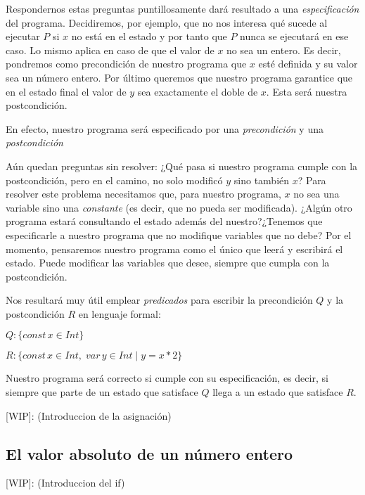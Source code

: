 \documentclass[11pt, a4paper, openany]{book}
\begin{document}
    Respondernos estas preguntas puntillosamente dará resultado a una \textit{especificación} del programa.
    Decidiremos, por ejemplo, que no nos interesa qué sucede al ejecutar $P$ si $x$ no está en el estado y por tanto que $P$ nunca se ejecutará en ese caso. Lo mismo aplica en caso de que el valor de $x$ no sea un entero. Es decir, pondremos como precondición de nuestro programa que $x$ esté definida y su valor sea un número entero. Por último queremos que nuestro programa garantice que en el estado final el valor de $y$ sea exactamente el doble de $x$. Esta será nuestra postcondición.

    En efecto, nuestro programa será especificado por una \textit{precondición} y una \textit{postcondición}

    Aún quedan preguntas sin resolver:
    ¿Qué pasa si nuestro programa cumple con la postcondición, pero en el camino, no solo modificó $y$ sino también $x$? Para resolver este problema necesitamos que, para nuestro programa, $x$ no sea una variable sino una \textit{constante} (es decir, que no pueda ser modificada).
    ¿Algún otro programa estará consultando el estado además del nuestro?¿Tenemos que especificarle a nuestro programa que no modifique variables que no debe? Por el momento, pensaremos nuestro programa como el único que leerá y escribirá el estado. Puede modificar las variables que desee, siempre que cumpla con la postcondición.

    Nos resultará muy útil emplear \textit{predicados} para escribir la precondición $Q$ y la postcondición $R$ en lenguaje formal:

    \begin{math}
        Q: \lbrace const\,x \in Int \rbrace
    \end{math}


    \begin{math}
        R: \lbrace const\,x \in Int,\; var\,y \in Int\;|\;y = x * 2 \rbrace
    \end{math}

    Nuestro programa será correcto si cumple con su especificación, es decir, si siempre que parte de un estado que satisface $Q$ llega a un estado que satisface $R$.

    [WIP]: (Introduccion de la asignación)

    \subsection{El valor absoluto de un número entero}
    [WIP]: (Introduccion del if)
\end{document}
